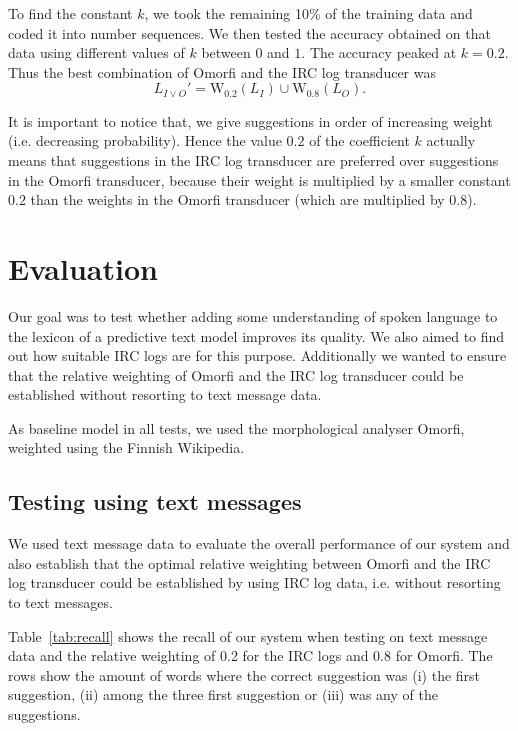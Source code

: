\documentclass[a4paper,conference]{IEEEtran}
\begin{document}
To find the constant $k$, we took the remaining 10\% of the training
data and coded it into number sequences. We then tested the accuracy
obtained on that data using different values of $k$ between $0$ and
$1$. The accuracy peaked at $k = 0.2$. Thus the best combination of Omorfi and the IRC log transducer was
\begin{equation}L_{I\vee O}' = \mathrm{W}_{0.2}(L_I) \cup \mathrm{W}_{0.8}(L_O)\text{.}\end{equation}

It is important to notice that, we give suggestions in order of
increasing weight (i.e. decreasing probability). Hence the value $0.2$
of the coefficient $k$ actually means that suggestions in the IRC log
transducer are preferred over suggestions in the Omorfi transducer,
because their weight is multiplied by a smaller constant $0.2$ than
the weights in the Omorfi transducer (which are multiplied by $0.8$).

\section{Evaluation}
\label{sec:evaluation}

Our goal was to test whether adding some understanding of spoken
language to the lexicon of a predictive text model improves its
quality. We also aimed to find out how suitable IRC logs are for this
purpose. Additionally we wanted to ensure that the relative weighting
of Omorfi and the IRC log transducer could be established without
resorting to text message data. 

As baseline model in all tests, we used the morphological analyser
Omorfi, weighted using the Finnish Wikipedia.


\subsection{Testing using text messages}
 
We used text message data to evaluate the overall performance of our
system and also establish that the optimal relative weighting between
Omorfi and the IRC log transducer could be established by using IRC
log data, i.e. without resorting to text messages.

Table~\ref{tab:recall} shows the recall of our system when testing on
text message data and the relative weighting of 0.2 for the IRC logs
and 0.8 for Omorfi. The rows show the amount of words where the
correct suggestion was (i) the first suggestion, (ii) among the three
first suggestion or (iii) was any of the suggestions.
\end{document}
